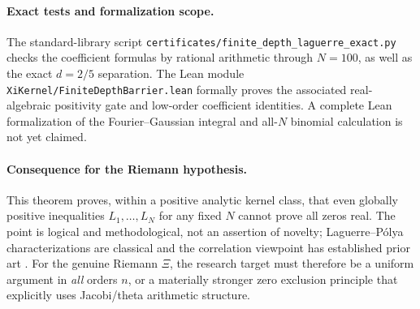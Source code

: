 \paragraph{Exact tests and formalization scope.}
The standard-library script
\texttt{certificates/finite\_depth\_laguerre\_exact.py}
checks the coefficient formulas by rational
arithmetic through $N=100$, as well as
the exact $d=2/5$ separation.
The Lean module
\texttt{XiKernel/FiniteDepthBarrier.lean}
formally proves the associated
real-algebraic positivity gate and low-order
coefficient identities. A complete Lean
formalization of the Fourier--Gaussian
integral and all-$N$ binomial calculation
is not yet claimed.

\paragraph{Consequence for the Riemann hypothesis.}
This theorem proves, within a positive
analytic kernel class, that even globally
positive inequalities
$L_1,\ldots,L_N$ for any fixed $N$
cannot prove all zeros real.
The point is logical and methodological,
not an assertion of novelty;
Laguerre--P\'olya characterizations are
classical and the correlation viewpoint
has established prior art
\cite{DX}.
For the genuine Riemann $\Xi$, the
research target must therefore be a
uniform argument in \emph{all} orders
$n$, or a materially stronger zero
exclusion principle that explicitly uses
Jacobi/theta arithmetic structure.
